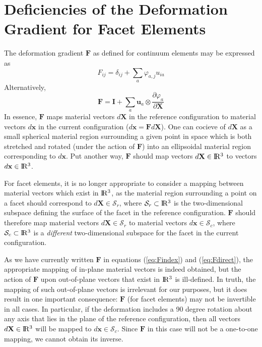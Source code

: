 \documentclass[11pt]{article} %
\begin{document}
\section{Deficiencies of the Deformation Gradient for Facet Elements}

The deformation gradient $\mathbf{F}$ as defined for continuum elements may be expressed as
\begin{equation}
	F_{ij} = \delta_{ij} + \sum_a \varphi_{a,j} u_{ia}
	\label{eq:Findex}
\end{equation}
Alternatively,
\begin{equation}
	\mathbf{F} = \mathbf{I} + \sum_a \mathbf{u}_a \otimes \frac{\partial \varphi_a}{\partial \mathbf{X}}
	\label{eq:Fdirect}
\end{equation}
In essence, $\mathbf{F}$ maps material vectors $d \mathbf{X}$ in the reference configuration to material vectors $d \mathbf{x}$ in the current configuration ($d \mathbf{x} = \mathbf{F} d \mathbf{X}$). One can cocieve of $d \mathbf{X}$ as a small spherical material region surrounding a given point in space which is both stretched and rotated (under the action of $\mathbf{F}$) into an ellipsoidal material region corresponding to $d \mathbf{x}$. Put another way, $\mathbf{F}$ should map vectors $d \mathbf{X} \in \rm I\!R^3$ to vectors $d \mathbf{x} \in \rm I\!R^3$.

For facet elements, it is no longer appropriate to consider a mapping between material vectors which exist in $\rm I\!R^3$, as the material region surrounding a point on a facet should correspond to $d \mathbf{X} \in \mathcal{S}_r$, where $\mathcal{S}_r \subset \rm I\!R^3$ is the two-dimensional subspace defining the surface of the facet in the reference configuration. $\mathbf{F}$ should therefore map material vectors $d \mathbf{X} \in \mathcal{S}_r$ to material vectors $d \mathbf{x} \in \mathcal{S}_c$, where $\mathcal{S}_c \subset \rm I\!R^3$ is a \textit{different} two-dimensional subspace for the facet in the current configuration.

As we have currently written $\mathbf{F}$ in equations (\ref{eq:Findex}) and (\ref{eq:Fdirect}), the appropriate mapping of in-plane material vectors is indeed obtained, but the action of $\mathbf{F}$ upon out-of-plane vectors that exist in $\rm I\!R^3$ is ill-defined. In truth, the mapping of such out-of-plane vectors is irrelevant for our purposes, but it does result in one important consequence: $\mathbf{F}$ (for facet elements) may not be invertible in all cases. In particular, if the deformation includes a 90 degree rotation about any axis that lies in the plane of the reference configuration, then all vectors $d \mathbf{X} \in \rm I\!R^3$ will be mapped to $d \mathbf{x} \in \mathcal{S}_c$. Since $\mathbf{F}$ in this case will not be a one-to-one mapping, we cannot obtain its inverse.
\end{document}
